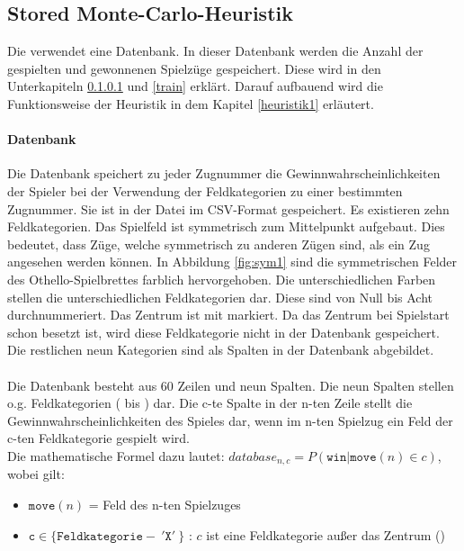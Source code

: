 \subsection{Stored Monte-Carlo-Heuristik}
Die  verwendet eine Datenbank. In dieser Datenbank werden die Anzahl der gespielten und gewonnenen Spielzüge gespeichert. Diese wird in den Unterkapiteln \ref{db}  und \ref{train} erklärt. Darauf aufbauend wird die Funktionsweise der Heuristik in dem Kapitel \ref{heuristik1} erläutert.
\paragraph{Datenbank}
\label{db}
Die Datenbank speichert zu jeder Zugnummer die Gewinnwahrscheinlichkeiten der Spieler bei der Verwendung der Feldkategorien zu einer bestimmten Zugnummer. Sie ist in der Datei  im CSV-Format gespeichert. Es existieren zehn Feldkategorien. 
Das Spielfeld ist symmetrisch zum Mittelpunkt aufgebaut. Dies bedeutet, dass Züge, welche symmetrisch zu anderen Zügen sind, als ein Zug angesehen werden können. In Abbildung \ref{fig:sym1} sind die symmetrischen Felder des Othello-Spielbrettes farblich hervorgehoben. Die unterschiedlichen Farben stellen die unterschiedlichen Feldkategorien dar. Diese sind von Null bis Acht durchnummeriert. Das Zentrum ist mit  markiert. Da das Zentrum bei Spielstart schon besetzt ist, wird diese Feldkategorie nicht in der Datenbank gespeichert. Die restlichen neun Kategorien sind als Spalten in der Datenbank abgebildet.
\\
\\Die Datenbank besteht aus 60 Zeilen und neun Spalten. Die neun Spalten stellen o.g. Feldkategorien (  bis ) dar. Die c-te Spalte in der n-ten Zeile stellt die Gewinnwahrscheinlichkeiten des Spieles dar, wenn im n-ten Spielzug ein Feld der c-ten Feldkategorie gespielt wird. 
\\Die mathematische Formel dazu lautet:
$database_{n,c} = P( \mathtt{win} | \mathtt{move}(n) \in c)$, wobei gilt:
\begin{itemize}
\item $\mathtt{move}(n)$ = Feld des n-ten Spielzuges
\item $\mathtt{c} \in \{\mathtt{Feldkategorie} -\ '\mathtt{X}'\ \}$ : $c$ ist eine Feldkategorie außer das Zentrum ()
\end{itemize}
